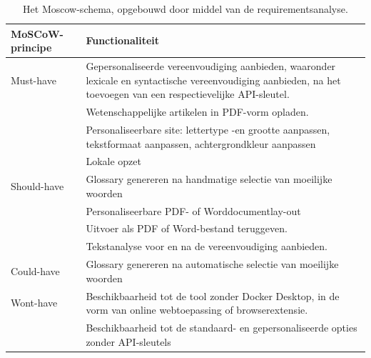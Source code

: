 
\medspace

\begin{center}
	\begin{table}

	\begin{tabular}{ | m{4cm} | m{12cm} | } 
		\hline
		\textbf{MoSCoW-principe} & Functionaliteit \\
		\hline
		Must-have & Gepersonaliseerde vereenvoudiging aanbieden, waaronder lexicale en syntactische vereenvoudiging aanbieden, na het toevoegen van een respectievelijke API-sleutel. \\
		& Wetenschappelijke artikelen in PDF-vorm opladen. \\
		& Personaliseerbare site: lettertype -en grootte aanpassen, tekstformaat aanpassen, achtergrondkleur aanpassen \\
		& Lokale opzet \\
		\hline
		Should-have & Glossary genereren na handmatige selectie van moeilijke woorden \\
		& Personaliseerbare PDF- of Worddocumentlay-out \\
		& Uitvoer als PDF of Word-bestand teruggeven. \\
		& Tekstanalyse voor en na de vereenvoudiging aanbieden. \\
		\hline
		Could-have & Glossary genereren na automatische selectie van moeilijke woorden \\
		\hline
		Wont-have & Beschikbaarheid tot de tool zonder Docker Desktop, in de vorm van online webtoepassing of browserextensie. \\
		& Beschikbaarheid tot de standaard- en gepersonaliseerde opties zonder API-sleutels \\
		\hline
	\end{tabular}
	\label{img:moscow-table}
	\caption{Het Moscow-schema, opgebouwd door middel van de requirementsanalyse.}
	\end{table}
\end{center}





